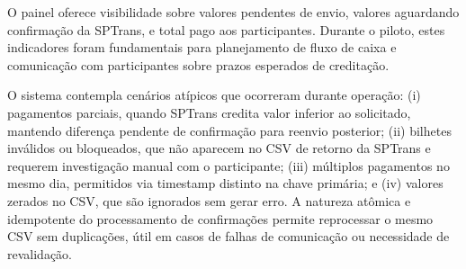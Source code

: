 O painel oferece visibilidade
sobre valores pendentes de envio, valores aguardando confirmação da SPTrans, e total pago aos participantes. 
Durante o piloto, estes indicadores foram fundamentais para
planejamento de fluxo de caixa e comunicação com participantes sobre prazos
esperados de creditação. 

O sistema contempla cenários
atípicos que ocorreram durante operação: (i) pagamentos parciais, quando SPTrans
credita valor inferior ao solicitado, mantendo diferença pendente de confirmação para reenvio posterior; (ii) bilhetes inválidos ou
bloqueados, que não aparecem no CSV de retorno da SPTrans e requerem investigação
manual com o participante; (iii) múltiplos pagamentos no mesmo dia, permitidos via
timestamp distinto na chave primária; e (iv) valores zerados no CSV, que são
ignorados sem gerar erro. A natureza atômica e idempotente do processamento de
confirmações permite reprocessar o mesmo CSV sem duplicações, útil em casos de
falhas de comunicação ou necessidade de revalidação.


